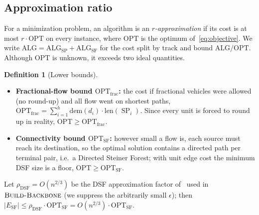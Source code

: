 \documentclass[11pt]{article}
\theoremstyle{definition}
\newtheorem{definition}{Definition}
\theoremstyle{remark}
\newcommand{\OPT}{\mathrm{OPT}}
\newcommand{\OPTfrac}{\OPT_{\mathrm{frac}}}
\newcommand{\OPTSF}{\OPT_{\mathrm{SF}}}
\newcommand{\ALG}{\mathrm{ALG}}
\newcommand{\ALGSP}{\ALG_{\mathrm{SP}}}
\newcommand{\ALGSF}{\ALG_{\mathrm{SF}}}
\newcommand{\ESF}{E_{\mathrm{SF}}}
\newcommand{\dem}{\mathrm{dem}}
\newcommand{\len}{\mathrm{len}}
\DeclareMathOperator{\SP}{SP}
\begin{document}
\subsection{Approximation ratio}\label{sec:ratio}

For a minimization problem, an algorithm is an \emph{$r$-approximation} if its cost is at most
$r\cdot\OPT$ on every instance, where $\OPT$ is the optimum of~\eqref{eq:objective}. We write
$\ALG=\ALGSP+\ALGSF$ for the cost split by track and bound $\ALG/\OPT$. Although $\OPT$ is unknown, it
exceeds two ideal quantities.

\begin{definition}[Lower bounds]\label{def:lb}
\leavevmode
\begin{itemize}[topsep=2pt,itemsep=2pt]
  \item \textbf{Fractional-flow bound $\OPTfrac$:} the cost if fractional vehicles were allowed (no
        round-up) and all flow went on shortest paths,
        $\OPTfrac=\sum_{i=1}^{h}\dem(d_i)\cdot\len(\SP_i)$. Since every unit is forced to round up in
        reality, $\OPT\ge\OPTfrac$.
  \item \textbf{Connectivity bound $\OPTSF$:} however small a flow is, each source must reach its
        destination, so the optimal solution contains a directed path per terminal pair, i.e.\ a
        Directed Steiner Forest; with unit edge cost the minimum DSF size is a floor, $\OPT\ge\OPTSF$.
\end{itemize}
\end{definition}

\noindent Let $\rho_{\mathrm{DSF}}=O(n^{2/3})$ be the DSF approximation factor of~\cite{BBMRY13} used
in $\textsc{Build-Backbone}$ (we suppress the arbitrarily small $\epsilon$); then
$|\ESF|\le\rho_{\mathrm{DSF}}\cdot\OPTSF=O(n^{2/3})\cdot\OPTSF$.
\end{document}
